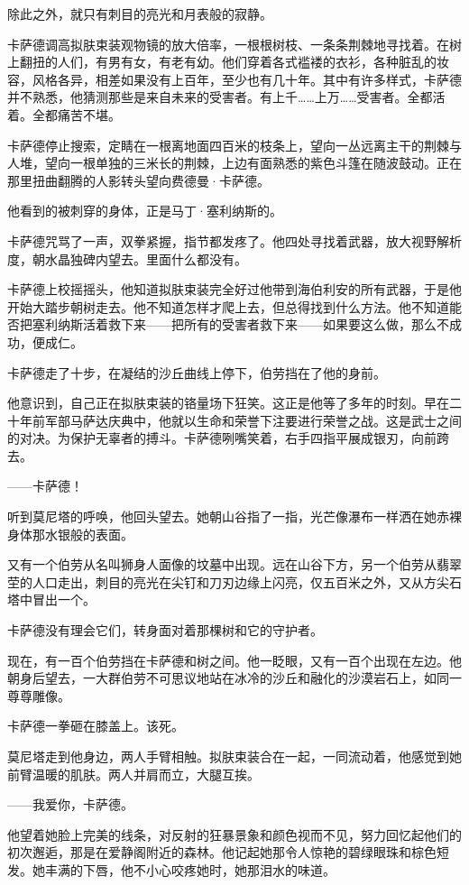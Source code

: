 \documentclass[AutoFakeBold=true]{book}
\begin{document}
除此之外，就只有刺目的亮光和月表般的寂静。

卡萨德调高拟肤束装观物镜的放大倍率，一根根树枝、一条条荆棘地寻找着。在树上翻扭的人们，有男有女，有老有幼。他们穿着各式褴褛的衣衫，各种脏乱的妆容，风格各异，相差如果没有上百年，至少也有几十年。其中有许多样式，卡萨德并不熟悉，他猜测那些是来自未来的受害者。有上千……上万……受害者。全都活着。全都痛苦不堪。

卡萨德停止搜索，定睛在一根离地面四百米的枝条上，望向一丛远离主干的荆棘与人堆，望向一根单独的三米长的荆棘，上边有面熟悉的紫色斗篷在随波鼓动。正在那里扭曲翻腾的人影转头望向费德曼·卡萨德。

他看到的被刺穿的身体，正是马丁·塞利纳斯的。

卡萨德咒骂了一声，双拳紧握，指节都发疼了。他四处寻找着武器，放大视野解析度，朝水晶独碑内望去。里面什么都没有。

卡萨德上校摇摇头，他知道拟肤束装完全好过他带到海伯利安的所有武器，于是他开始大踏步朝树走去。他不知道怎样才爬上去，但总得找到什么方法。他不知道能否把塞利纳斯活着救下来——把所有的受害者救下来——如果要这么做，那么不成功，便成仁。

卡萨德走了十步，在凝结的沙丘曲线上停下，伯劳挡在了他的身前。

他意识到，自己正在拟肤束装的铬量场下狂笑。这正是他等了多年的时刻。早在二十年前军部马萨达庆典中，他就以生命和荣誉下注要进行荣誉之战。这是武士之间的对决。为保护无辜者的搏斗。卡萨德咧嘴笑着，右手四指平展成银刃，向前跨去。

{\kaishu ——卡萨德！}

听到莫尼塔的呼唤，他回头望去。她朝山谷指了一指，光芒像瀑布一样洒在她赤裸身体那水银般的表面。

又有一个伯劳从名叫狮身人面像的坟墓中出现。远在山谷下方，另一个伯劳从翡翠茔的人口走出，刺目的亮光在尖钉和刀刃边缘上闪亮，仅五百米之外，又从方尖石塔中冒出一个。

卡萨德没有理会它们，转身面对着那棵树和它的守护者。

现在，有一百个伯劳挡在卡萨德和树之间。他一眨眼，又有一百个出现在左边。他朝身后望去，一大群伯劳不可思议地站在冰冷的沙丘和融化的沙漠岩石上，如同一尊尊雕像。

卡萨德一拳砸在膝盖上。{\kaishu 该死。}

莫尼塔走到他身边，两人手臂相触。拟肤束装合在一起，一同流动着，他感觉到她前臂温暖的肌肤。两人并肩而立，大腿互挨。

{\kaishu ——我爱你，卡萨德。}

他望着她脸上完美的线条，对反射的狂暴景象和颜色视而不见，努力回忆起他们的初次邂逅，那是在爱静阁附近的森林。他记起她那令人惊艳的碧绿眼珠和棕色短发。她丰满的下唇，他不小心咬疼她时，她那泪水的味道。
\end{document}
